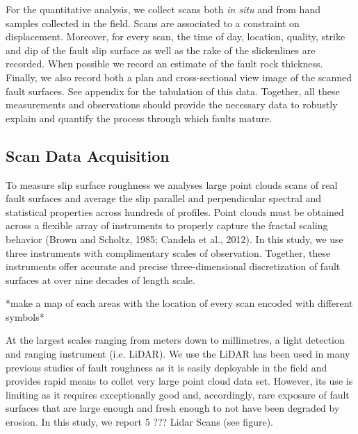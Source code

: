 \documentclass[12pt,a4paper]{article}
\begin{document}
For the quantitative analysis, we collect scans both \textit{in situ} and from hand samples collected in the field. Scans are associated to a constraint on displacement. Moreover, for every scan, the time of day, location, quality, strike and dip of the fault slip surface as well as the rake of the slickenlines are recorded. When possible we record an estimate of the fault rock thickness. Finally, we also record both a plan and cross-sectional view image of the scanned fault surfaces.  See appendix for the tabulation of this data. Together, all these measurements and observations should provide the necessary data to robustly explain and quantify the process through which faults mature.

	\subsection{Scan Data Acquisition}

To measure slip surface roughness we analyses large point clouds scans of real fault surfaces and average the slip parallel and perpendicular spectral and statistical properties across hundreds of profiles. Point clouds must be obtained across a flexible array of instruments to properly capture the fractal scaling behavior (Brown and Scholtz, 1985; Candela et al., 2012). In this study, we use three instruments with complimentary scales of observation.  Together, these instruments offer accurate and precise three-dimensional discretization of fault surfaces at over nine decades of length scale.

*make a map of each areas with the location of every scan encoded with different symbols*

At the largest scales ranging from meters down to millimetres, a light detection and ranging instrument (i.e. LiDAR). We use the  LiDAR has been used in many previous studies of fault roughness as it is easily deployable in the field and provides rapid means to collet very large point cloud data set. However, its use is limiting as it requires exceptionally good and, accordingly, rare exposure of fault surfaces that are large enough and fresh enough to not have been degraded by erosion. In this study, we report 5 ??? Lidar Scans (see figure).
\end{document}

